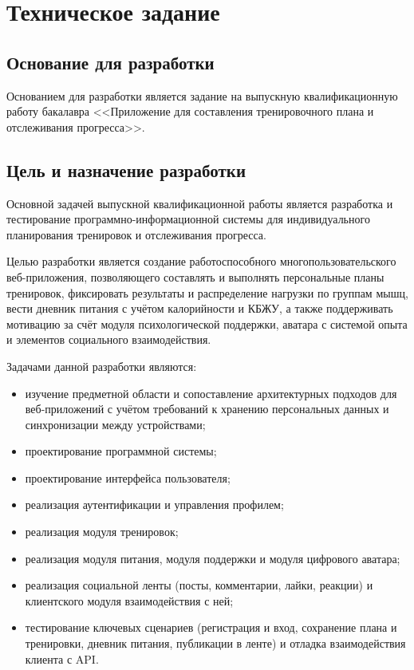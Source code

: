 \section{Техническое задание}

\subsection{Основание для разработки}

Основанием для разработки является задание на выпускную квалификационную работу бакалавра <<Приложение для составления тренировочного плана и отслеживания прогресса>>.

\subsection{Цель и назначение разработки}

Основной задачей выпускной квалификационной работы является разработка и тестирование программно-информационной системы для индивидуального планирования тренировок и отслеживания прогресса.

Целью разработки является создание работоспособного многопользовательского веб-приложения, позволяющего составлять и выполнять персональные планы тренировок, фиксировать результаты и распределение нагрузки по группам мышц, вести дневник питания с учётом калорийности и КБЖУ, а также поддерживать мотивацию за счёт модуля психологической поддержки, аватара с системой опыта и элементов социального взаимодействия.

Задачами данной разработки являются:
\begin{itemize}
	\item изучение предметной области и сопоставление архитектурных подходов для веб-приложений с учётом требований к хранению персональных данных и синхронизации между устройствами;
	\item проектирование программной системы;
	\item проектирование интерфейса пользователя;
	\item реализация аутентификации и управления профилем;
	\item реализация модуля тренировок;
	\item реализация модуля питания, модуля поддержки и модуля цифрового аватара;
	\item реализация социальной ленты (посты, комментарии, лайки, реакции) и клиентского модуля взаимодействия с ней;
	\item тестирование ключевых сценариев (регистрация и вход, сохранение плана и тренировки, дневник питания, публикации в ленте) и отладка взаимодействия клиента с API.
\end{itemize}

